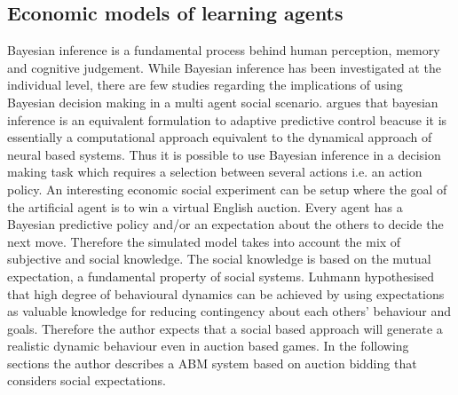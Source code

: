 \subsection{Economic models of learning agents}

Bayesian inference is a fundamental process behind human perception,
memory and cognitive judgement. While Bayesian inference has been investigated
 at the individual level, there are few studies regarding the implications of
 using Bayesian decision making in a multi agent social scenario.
\citet{Verschure98epistemol} argues that bayesian inference is an equivalent formulation to 
adaptive predictive control beacuse it is essentially a computational approach 
equivalent to the dynamical approach of neural based systems.
Thus it is possible to use Bayesian inference in a decision making task which requires
a selection between several actions i.e. an action policy.
An interesting economic social experiment can be setup where the goal of the
 artificial agent is to win a virtual English auction.
Every agent has a Bayesian predictive policy and/or an expectation about the
 others to decide the next move.
Therefore the simulated model takes into account the mix of subjective and
 social knowledge.
The social knowledge is based on the mutual expectation, a fundamental property
 of social systems. Luhmann hypothesised that high degree of behavioural dynamics
 can be achieved by using expectations as valuable knowledge for reducing
contingency about each others' behaviour and goals.
Therefore the author expects that a social based approach will generate
a realistic dynamic behaviour even in auction based games.
In the following sections the author describes a ABM system based on
 auction bidding that considers social expectations.

